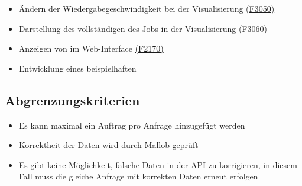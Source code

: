 \begin{itemize}[noitemsep]
        \item Ändern der Wiedergabegeschwindigkeit bei der Visualisierung \hyperref[FA:Visualisierung:Aendern der Wiedergabegeschwindigkeit]{(F3050)}
        \item Darstellung des vollständigen  des \hyperref[B:Jobs]{Jobs} in der Visualisierung \hyperref[FA:Visualisierung:Anzeigen des Binaerbaumes für einen Job]{(F3060)}
        \item Anzeigen von  im \gls{Web-Interface} \hyperref[FA:Web-Interface:Anzeigen von Plugins]{(F2170)}
        \item Entwicklung eines beispielhaften 
    \end{itemize}
    
\subsection{Abgrenzungskriterien}
    \begin{itemize}[noitemsep]
        \item Es kann maximal ein Auftrag pro Anfrage hinzugefügt werden
        \item Korrektheit der Daten wird durch \gls{Mallob} geprüft
        \item Es gibt keine Möglichkeit, falsche Daten in der \gls{API} zu korrigieren, in diesem Fall muss die gleiche Anfrage mit korrekten Daten erneut erfolgen
    \end{itemize}
